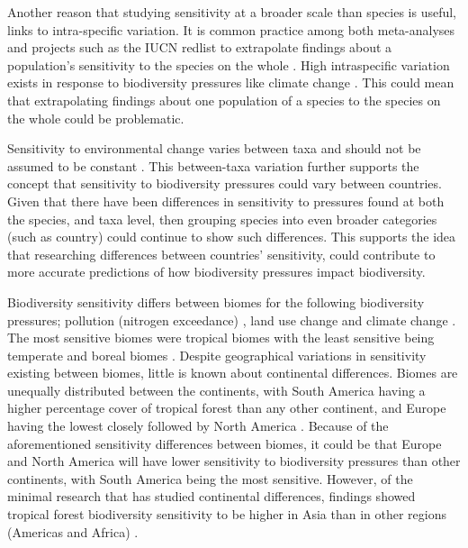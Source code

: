 \documentclass[11pt, a4paper, titlepage]{article}
\begin{document}
   	 Another reason that studying sensitivity at a broader scale than species is useful, links to intra-specific variation. It is common practice among both meta-analyses and projects such as the IUCN redlist to extrapolate findings about a population's sensitivity to the species on the whole \citep{iucn2001iucn} \citep{buckley2012functional}. High intraspecific variation exists in response to biodiversity pressures like climate change \citep{mclean2018high} \citep{both2004large} \citep{mayor2016assessing}. This could mean that extrapolating findings about one population of a species to the species on the whole could be problematic. \newline
   	 
   	 Sensitivity to environmental change varies between taxa and should not be assumed to be constant \citep{sunday2015species}. This between-taxa variation further supports the concept that sensitivity to biodiversity pressures could vary between countries. Given that there have been differences in sensitivity to pressures found at both the species, and taxa level, then grouping species into even broader categories (such as country) could continue to show such differences. This supports the idea that researching differences between countries' sensitivity, could contribute to more accurate predictions of how biodiversity pressures impact biodiversity. \newline
   	 
   	 Biodiversity sensitivity differs between biomes for the following biodiversity pressures; pollution (nitrogen exceedance) \citep{alkemade2009globio3}, land use change and climate change \citep{newbold2020tropical}. The most sensitive biomes were tropical biomes \citep{barlow2016anthropogenic} with the least sensitive being temperate and boreal biomes \citep{newbold2020tropical} \citep{cazalis2021mismatch} \citep{barlow2016anthropogenic}. Despite geographical variations in sensitivity existing between biomes, little is known about continental differences. Biomes are unequally distributed between the continents, with South America having a higher percentage cover of tropical forest than any other continent, and Europe having the lowest closely followed by North America \citep{wade2003distribution}.  Because of the aforementioned sensitivity differences between biomes, it could be that Europe and North America will have lower sensitivity to biodiversity pressures than other continents, with South America being the most sensitive. However, of the minimal research that has studied continental differences, findings showed tropical forest biodiversity sensitivity to be higher in Asia than in other regions (Americas and Africa) \citep{gibson2011primary}. 
   	
\end{document}

